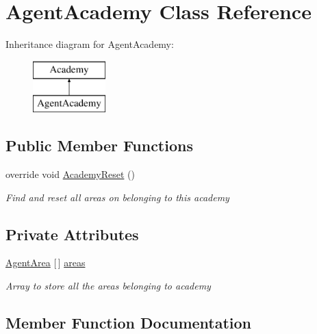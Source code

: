 \hypertarget{class_agent_academy}{}\section{Agent\+Academy Class Reference}
\label{class_agent_academy}
Inheritance diagram for Agent\+Academy\+:\begin{figure}[H]
\begin{center}
\leavevmode
\includegraphics[height=2.000000cm]{class_agent_academy}
\end{center}
\end{figure}
\subsection*{Public Member Functions}
\begin{DoxyCompactItemize}
\item 
override void \mbox{\hyperlink{class_agent_academy_a8b2364d46bdc23c557822d4ae78b7497}{Academy\+Reset}} ()
\begin{DoxyCompactList}\small\item\em Find and reset all areas on belonging to this academy \end{DoxyCompactList}\end{DoxyCompactItemize}
\subsection*{Private Attributes}
\begin{DoxyCompactItemize}
\item 
\mbox{\hyperlink{class_agent_area}{Agent\+Area}} \mbox{[}$\,$\mbox{]} \mbox{\hyperlink{class_agent_academy_a52f0f105505b5a8185fdf89c75382a74}{areas}}
\begin{DoxyCompactList}\small\item\em Array to store all the areas belonging to academy \end{DoxyCompactList}\end{DoxyCompactItemize}


\subsection{Member Function Documentation}
\mbox{\label{class_agent_academy_a8b2364d46bdc23c557822d4ae78b7497}} 
